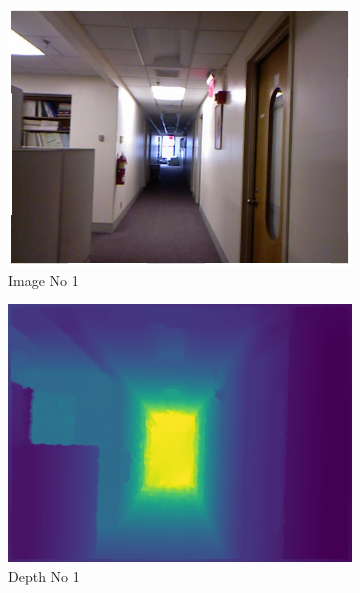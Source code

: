 \documentclass[a4paper, openany]{book}
\begin{document}
\begin{figure}[ht]
  \centering
  \begin{subfigure}[b]{0.3\linewidth}
    \includegraphics[width=\linewidth]{images/imgNo14.png}
    \caption{Image No 1}
  \end{subfigure}
  \begin{subfigure}[b]{0.3\linewidth}
    \includegraphics[width=\linewidth]{images/depthNo14.png}
    \caption{Depth No 1}
  \end{subfigure}
    \begin{subfigure}[b]{0.3\linewidth}

\end{subfigure}
\end{figure}
\end{document}

